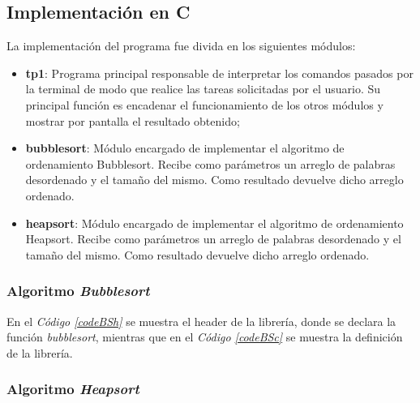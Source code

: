 \documentclass{article}
\newcommand{\refcode}[1]{\textit{Código \ref{#1}}}
\begin{document}
\subsection{Implementación en C}

	La implementación del programa fue divida en los siguientes módulos:
	\medskip

\begin{itemize}

\itemsep=2pt \topsep=0pt \partopsep=0pt \parskip=0pt \parsep=0pt
	\item \textbf{tp1}: Programa principal responsable de interpretar los comandos pasados por la terminal de modo que realice las tareas solicitadas por el usuario. Su principal función es encadenar el funcionamiento de los otros módulos y mostrar por pantalla el resultado obtenido;
	\item \textbf{bubblesort}: Módulo encargado de implementar el algoritmo de ordenamiento Bubblesort. Recibe como parámetros un arreglo de palabras desordenado y el tamaño del mismo. Como resultado devuelve dicho arreglo ordenado.
	\item \textbf{heapsort}: Módulo encargado de implementar el algoritmo de ordenamiento Heapsort. Recibe como parámetros un arreglo de palabras desordenado y el tamaño del mismo. Como resultado devuelve dicho arreglo ordenado.

\end{itemize}	
\medskip


\subsubsection{Algoritmo \textit{Bubblesort}}

	En el \refcode{codeBSh} se muestra el header de la librería, donde se declara la función \textit{bubblesort}, mientras que en el \refcode{codeBSc} se muestra la definición de la librería.

\lstset{ language = C } %
 
\bigskip


\lstset{ language = C } %
 
\bigskip\bigskip




\subsubsection{Algoritmo \textit{Heapsort}}
\end{document}
